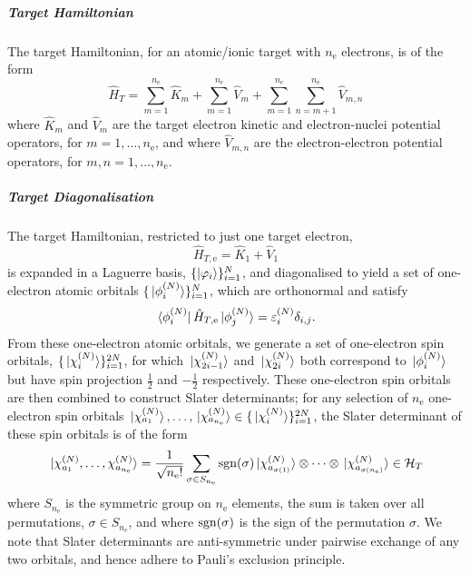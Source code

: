 \documentclass[draft]{article}
\begin{document}
\subparagraph{Target Hamiltonian}
\label{sec:target-hamiltonian}

The target Hamiltonian, for an atomic/ionic target with $n_{\mathrm{e}}$
electrons, is of the form
\begin{equation}
  \label{eq:target-hamiltonian}
  \hat{H}_{T}
  =
  \sum_{m = 1}^{n_{\mathrm{e}}}
  \hat{K}_{m}
  +
  \sum_{m = 1}^{n_{\mathrm{e}}}
  \hat{V}_{m}
  +
  \sum_{m = 1}^{n_{\mathrm{e}}}
  \sum_{n = m + 1}^{n_{\mathrm{e}}}
  \hat{V}_{m, n}
\end{equation}
where $\hat{K}_{m}$ and $\hat{V}_{m}$ are the target electron kinetic and
electron-nuclei potential operators, for $m = 1, \dotsc, n_{\mathrm{e}}$, and
where $\hat{V}_{m, n}$ are the electron-electron potential operators, for
$m, n = 1, \dotsc, n_{\mathrm{e}}$.

\subparagraph{Target Diagonalisation}
\label{sec:target-diagonalisation}

The target Hamiltonian, restricted to just one target electron,
\begin{equation}
  \label{eq:target-1e-hamiltonian}
  \hat{H}_{T, \mathrm{e}}^{}
  =
  \hat{K}_{1}
  +
  \hat{V}_{1}
\end{equation}
is expanded in a Laguerre basis, $\lbrace\ket{\varphi_{i}}\rbrace_{i = 1}^{N}$, and
diagonalised to yield a set of one-electron atomic orbitals
$\lbrace\ket*{\phi_{i}^{(N)}}\rbrace_{i = 1}^{N}$, which are orthonormal and
satisfy
\begin{equation}
  \label{eq:target-1e-orbitals}
  \bra*{\phi_{i}^{(N)}}
  \hat{H}_{T, \mathrm{e}}
  \ket*{\phi_{j}^{(N)}}
  =
  \varepsilon_{i}^{(N)}
  \delta_{i, j}
  .
\end{equation}
From these one-electron atomic orbitals, we generate a set of one-electron spin
orbitals, $\lbrace\ket*{\chi_{i}^{(N)}}\rbrace_{i = 1}^{2N}$, for which
$\ket*{\chi_{2i - 1}^{(N)}}$ and $\ket*{\chi_{2i}^{(N)}}$ both correspond
to $\ket*{\phi_{i}^{(N)}}$ but have spin projection $\tfrac{1}{2}$ and
$-\tfrac{1}{2}$ respectively.
These one-electron spin orbitals are then combined to construct Slater
determinants; for any selection of $n_{\mathrm{e}}$ one-electron spin orbitals
$\ket*{\chi_{a_{1}}^{(N)}}, \dotsc, \ket*{\chi_{a_{n_{\mathrm{e}}}}^{(N)}}
\in \lbrace\ket*{\chi_{i}^{(N)}}\rbrace_{i = 1}^{2N}$, the Slater determinant of
these spin orbitals is of the form
\begin{equation}
  \label{eq:target-slater-determinant}
  \ket*
  {
    \chi_{a_{1}}^{(N)},
    \dotsc,
    \chi_{a_{n_{\mathrm{e}}}}^{(N)}
  }
  =
  \dfrac{1}{\sqrt{n_{\mathrm{e}}!}}
  \sum_{\sigma \in S_{n_{\mathrm{e}}}}
  \mathrm{sgn}(\sigma)
  \ket*{\chi_{a_{\sigma(1)}}^{(N)}}
  \otimes
  \dots
  \otimes
  \ket*{\chi_{a_{\sigma(n_{\mathrm{e}})}}^{(N)}}
  \in
  \mathcal{H}_{T}
\end{equation}
where $S_{n_{\mathrm{e}}}$ is the symmetric group on $n_{\mathrm{e}}$ elements,
the sum is taken over all permutations, $\sigma \in S_{n_{\mathrm{e}}}$, and
where $\mathrm{sgn}(\sigma)$ is the sign of the permutation $\sigma$.
We note that Slater determinants are anti-symmetric under pairwise exchange of
any two orbitals, and hence adhere to Pauli's exclusion principle.
\end{document}
